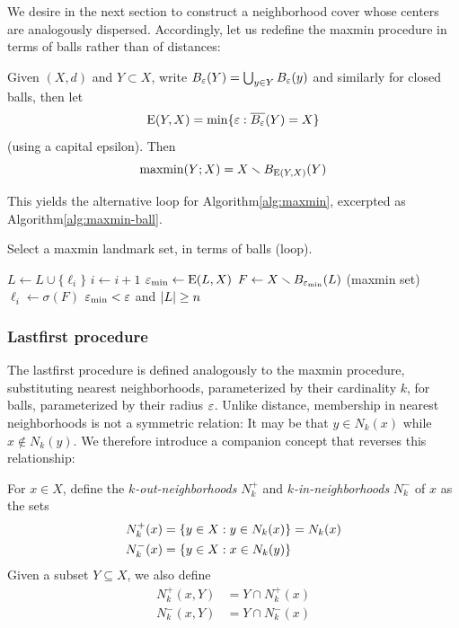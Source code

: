\documentclass{article}
\begin{document}
We desire in the next section to construct a neighborhood cover whose
centers are analogously dispersed. Accordingly, let us redefine the
maxmin procedure in terms of balls rather than of distances:

\begin{proposition}\label{prop:maxmin}
    Given $(X,d)$ and $Y \subset X$, write $B_\varepsilon(Y) = \bigcup_{y \in Y}{B_\varepsilon(y)}$ and similarly for closed balls, then let
    $${\mathrm{E}}(Y,X) = \min\{ \varepsilon : \overline{B_\varepsilon}(Y) = X \}$$
    (using a capital epsilon). Then
    $$\operatorname{maxmin}(Y;X) = X \smallsetminus B_{{\mathrm{E}}(Y,X)}(Y)$$
\end{proposition}

This yields the alternative loop for Algorithm\nbs\ref{alg:maxmin},
excerpted as Algorithm\nbs\ref{alg:maxmin-ball}.

\begin{algorithm}
\caption{Select a maxmin landmark set, in terms of balls (loop).}
\label{alg:maxmin-ball}
\begin{algorithmic}[1]
\REPEAT
    \STATE $L \leftarrow L\cup\{\ell_i\}$
    \STATE $i \leftarrow i+1$
    \STATE $\varepsilon_{\min} \leftarrow {\mathrm{E}}(L,X)$
    \STATE $F \leftarrow X \smallsetminus B_{\varepsilon_{\min}}(L)$ (maxmin set)
    \STATE $\ell_i \leftarrow \sigma(F)$
\UNTIL $\varepsilon_{\min} < \varepsilon$ and $\lvert L\rvert \geq n$
\end{algorithmic}
\end{algorithm}

\hypertarget{lastfirst-procedure}{%
\subsubsection{Lastfirst procedure}\label{lastfirst-procedure}}

\label{sec:lastfirst}

The lastfirst procedure is defined analogously to the maxmin procedure,
substituting nearest neighborhoods, parameterized by their cardinality
\(k\), for balls, parameterized by their radius \(\varepsilon\). Unlike
distance, membership in nearest neighborhoods is not a symmetric
relation: It may be that \(y \in N_k(x)\) while \(x \notin N_k(y)\). We
therefore introduce a companion concept that reverses this relationship:

\begin{definition}[$k$-neighborhoods]
    For $x \in X$, define the \emph{$k$-out-neighborhoods} $N^+_k$ and \emph{$k$-in-neighborhoods} $N^-_k$ of $x$ as the sets
    \begin{align*}
        N^+_k(x) &= \{ y\in X : y \in N_k(x) \} = N_k(x) \\
        N^-_k(x) &= \{ y\in X : x \in N_k(y) \}
    \end{align*}
    Given a subset $Y \subseteq X$, we also define
    \begin{align*}
        N^+_k(x,Y) &= Y \cap N^+_k(x) \\
        N^-_k(x,Y) &= Y \cap N^-_k(x)
    \end{align*}
\end{definition}
\end{document}
